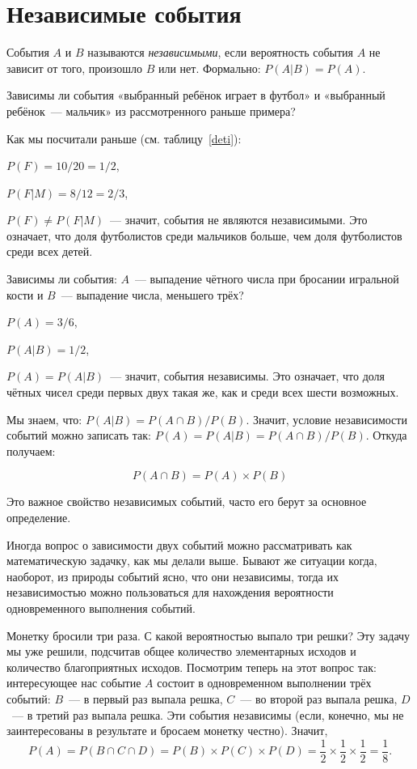 \documentclass[12pt,a4paper]{article}
\begin{document}
\section{Независимые события}
События $A$ и $B$ называются \emph{независимыми}, если вероятность события $A$ не зависит от того, произошло $B$ или нет. Формально: $P(A|B)=P(A)$.

\begin{example}
	Зависимы ли события «выбранный ребёнок играет в футбол» и «выбранный ребёнок~--- мальчик» из рассмотренного раньше примера?

	Как мы посчитали раньше (см. таблицу~\ref{deti}):

	$P(F)=10/20=1/2$,

	$P(F |M)=8/12=2/3$,

	$P(F)\neq P(F |M)$~--- значит, события не являются независимыми. Это означает, что доля футболистов среди мальчиков больше, чем доля футболистов среди всех детей.
\end{example}

\begin{example}
	 Зависимы ли события: $A$~--- выпадение чётного числа при бросании игральной кости и $B$~--- выпадение числа, меньшего трёх?

	 $P(A)=3/6$,

	 $P(A|B)=1/2$,

	$P(A)= P(A|B)$~--- значит, события независимы. Это означает, что доля чётных чисел среди первых двух такая же, как и среди всех шести возможных.
\end{example}

Мы знаем, что: $P(A|B) =P(A\cap B)/P(B)$. Значит, условие независимости событий можно записать так: $P(A)=P(A|B)=P(A\cap B)/P(B)$. Откуда получаем:

$$P(A\cap B)=P(A)\times P(B)$$

Это важное свойство независимых событий, часто его берут за основное определение.

Иногда вопрос о зависимости двух событий можно рассматривать как математическую задачку, как мы делали выше. Бывают же ситуации когда, наоборот, из природы событий ясно, что они независимы, тогда их независимостью можно пользоваться для нахождения вероятности одновременного выполнения событий.

\begin{example}
	Монетку бросили три раза. С какой вероятностью выпало три решки? Эту задачу мы уже решили, подсчитав общее количество элементарных исходов и количество благоприятных исходов. Посмотрим теперь на этот вопрос так: интересующее нас событие $A$ состоит в одновременном выполнении трёх событий: $B$~--- в первый раз выпала решка, $C$~--- во второй раз выпала решка, $D$~--- в третий раз выпала решка. Эти события независимы (если, конечно, мы не заинтересованы в результате и бросаем монетку честно). Значит,
	$$
		P(A)=P(B\cap C\cap D)=P(B)\times P(C)\times P(D)=\frac{1}{2}\times\frac{1}{2}\times\frac{1}{2}=\frac{1}{8}.
	$$
\end{example}
\end{document}
